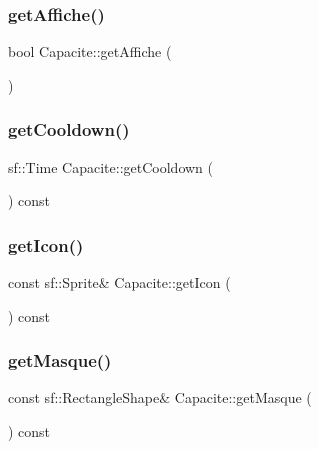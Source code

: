 \mbox{\label{class_capacite_a6dd5ea561e52140a345be7e62a33cf1f}} 
\subsubsection{\texorpdfstring{get\+Affiche()}{getAffiche()}}
{\footnotesize\ttfamily bool Capacite\+::get\+Affiche (\begin{DoxyParamCaption}{ }\end{DoxyParamCaption})\hspace{0.3cm}{\ttfamily [inline]}}

\mbox{\label{class_capacite_aeb57084eeda5d3ac828714fc029d47f9}} 
\subsubsection{\texorpdfstring{get\+Cooldown()}{getCooldown()}}
{\footnotesize\ttfamily sf\+::\+Time Capacite\+::get\+Cooldown (\begin{DoxyParamCaption}{ }\end{DoxyParamCaption}) const\hspace{0.3cm}{\ttfamily [inline]}}

\mbox{\label{class_capacite_aa66c20bba4433f871c91c3836a0c1929}} 
\subsubsection{\texorpdfstring{get\+Icon()}{getIcon()}}
{\footnotesize\ttfamily const sf\+::\+Sprite\& Capacite\+::get\+Icon (\begin{DoxyParamCaption}{ }\end{DoxyParamCaption}) const\hspace{0.3cm}{\ttfamily [inline]}}

\mbox{\label{class_capacite_a4585b46b989301b127a93dc062a0b8aa}} 
\subsubsection{\texorpdfstring{get\+Masque()}{getMasque()}}
{\footnotesize\ttfamily const sf\+::\+Rectangle\+Shape\& Capacite\+::get\+Masque (\begin{DoxyParamCaption}{ }\end{DoxyParamCaption}) const\hspace{0.3cm}{\ttfamily [inline]}}


